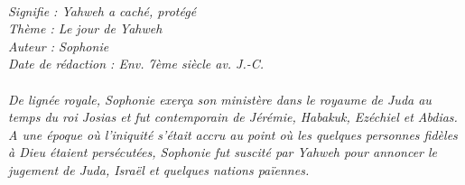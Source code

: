 \BFont
\noindent\hrulefill
\textit{
\bigskip
{\centering{}
\\Signifie : Yahweh a caché, protégé
\\Thème : Le jour de Yahweh
\\Auteur : Sophonie
\\Date de rédaction : Env. 7ème siècle av. J.-C.\\}
}
\textit{
\\De lignée royale, Sophonie exerça son ministère dans le royaume de Juda au temps du roi Josias et fut contemporain de Jérémie, Habakuk, Ezéchiel et Abdias. A une époque où l’iniquité s’était accru au point où les quelques personnes fidèles à Dieu étaient persécutées, Sophonie fut suscité par Yahweh pour annoncer le jugement de Juda, Israël et quelques nations païennes.\bigskip
}
\par\nobreak\noindent\hrulefill
